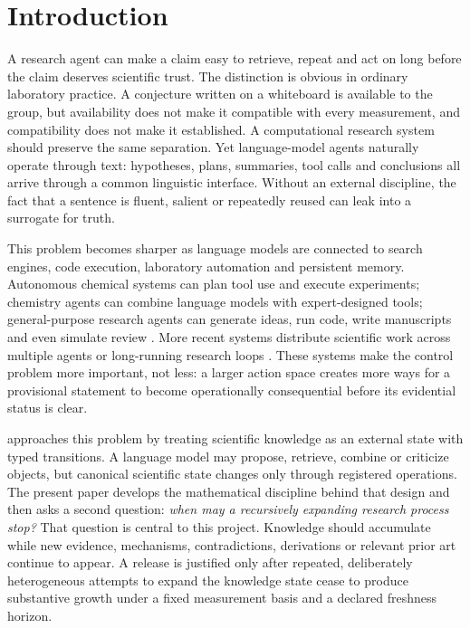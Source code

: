 \section{Introduction}

A research agent can make a claim easy to retrieve, repeat and act on long before the claim deserves scientific trust. The distinction is obvious in ordinary laboratory practice. A conjecture written on a whiteboard is available to the group, but availability does not make it compatible with every measurement, and compatibility does not make it established. A computational research system should preserve the same separation. Yet language-model agents naturally operate through text: hypotheses, plans, summaries, tool calls and conclusions all arrive through a common linguistic interface. Without an external discipline, the fact that a sentence is fluent, salient or repeatedly reused can leak into a surrogate for truth.

This problem becomes sharper as language models are connected to search engines, code execution, laboratory automation and persistent memory. Autonomous chemical systems can plan tool use and execute experiments; chemistry agents can combine language models with expert-designed tools; general-purpose research agents can generate ideas, run code, write manuscripts and even simulate review \cite{boiko2023,bran2024,lu2024}. More recent systems distribute scientific work across multiple agents or long-running research loops \cite{gottweis2025,kosmos2025}. These systems make the control problem more important, not less: a larger action space creates more ways for a provisional statement to become operationally consequential before its evidential status is clear.

\RAKL{} approaches this problem by treating scientific knowledge as an external state with typed transitions. A language model may propose, retrieve, combine or criticize objects, but canonical scientific state changes only through registered operations. The present paper develops the mathematical discipline behind that design and then asks a second question: \emph{when may a recursively expanding research process stop?} That question is central to this project. Knowledge should accumulate while new evidence, mechanisms, contradictions, derivations or relevant prior art continue to appear. A release is justified only after repeated, deliberately heterogeneous attempts to expand the knowledge state cease to produce substantive growth under a fixed measurement basis and a declared freshness horizon.

